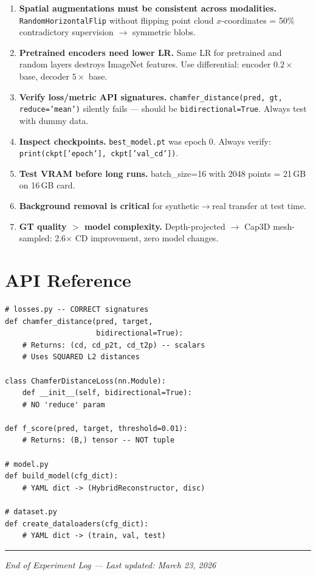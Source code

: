 \documentclass[10pt,twocolumn,letterpaper]{article}
\begin{document}
\begin{enumerate}[nosep,leftmargin=*]
\item \textbf{Spatial augmentations must be consistent across modalities.} \texttt{RandomHorizontalFlip} without flipping point cloud $x$-coordinates = 50\% contradictory supervision $\to$ symmetric blobs.

\item \textbf{Pretrained encoders need lower LR.} Same LR for pretrained and random layers destroys ImageNet features. Use differential: encoder $0.2\times$ base, decoder $5\times$ base.

\item \textbf{Verify loss/metric API signatures.} \texttt{chamfer\_distance(pred, gt, reduce='mean')} silently fails --- should be \texttt{bidirectional=True}. Always test with dummy data.

\item \textbf{Inspect checkpoints.} \texttt{best\_model.pt} was epoch 0. Always verify: \texttt{print(ckpt['epoch'], ckpt['val\_cd'])}.

\item \textbf{Test VRAM before long runs.} batch\_size=16 with 2048 points = 21\,GB on 16\,GB card.

\item \textbf{Background removal is critical} for synthetic$\to$real transfer at test time.

\item \textbf{GT quality $>$ model complexity.} Depth-projected $\to$ Cap3D mesh-sampled: 2.6$\times$ CD improvement, zero model changes.
\end{enumerate}

\section{API Reference}

\begin{lstlisting}
# losses.py -- CORRECT signatures
def chamfer_distance(pred, target,
                     bidirectional=True):
    # Returns: (cd, cd_p2t, cd_t2p) -- scalars
    # Uses SQUARED L2 distances

class ChamferDistanceLoss(nn.Module):
    def __init__(self, bidirectional=True):
    # NO 'reduce' param

def f_score(pred, target, threshold=0.01):
    # Returns: (B,) tensor -- NOT tuple

# model.py
def build_model(cfg_dict):
    # YAML dict -> (HybridReconstructor, disc)

# dataset.py
def create_dataloaders(cfg_dict):
    # YAML dict -> (train, val, test)
\end{lstlisting}

\vspace{6pt}
\noindent\rule{\columnwidth}{0.4pt}
\begin{center}
\small\textit{End of Experiment Log --- Last updated: March 23, 2026}
\end{center}
\end{document}
